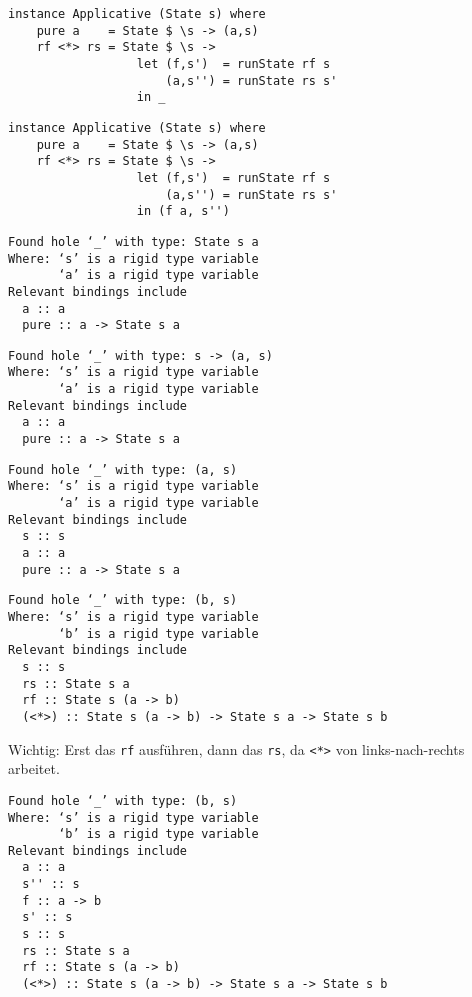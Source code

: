 \documentclass{beamer}
\begin{document}
\begin{frame}[fragile]
\begin{overprint}
\begin{verbatim}
\end{verbatim}
\begin{verbatim}
instance Applicative (State s) where
    pure a    = State $ \s -> (a,s)
    rf <*> rs = State $ \s ->
                  let (f,s')  = runState rf s
                      (a,s'') = runState rs s'
                  in _
\end{verbatim}
\begin{verbatim}
instance Applicative (State s) where
    pure a    = State $ \s -> (a,s)
    rf <*> rs = State $ \s ->
                  let (f,s')  = runState rf s
                      (a,s'') = runState rs s'
                  in (f a, s'')
\end{verbatim}
\end{overprint}
\bigskip
\scriptsize
\begin{overprint}
\begin{verbatim}
Found hole ‘_’ with type: State s a
Where: ‘s’ is a rigid type variable
       ‘a’ is a rigid type variable
Relevant bindings include
  a :: a
  pure :: a -> State s a
\end{verbatim}
\begin{verbatim}
Found hole ‘_’ with type: s -> (a, s)
Where: ‘s’ is a rigid type variable
       ‘a’ is a rigid type variable
Relevant bindings include
  a :: a
  pure :: a -> State s a
\end{verbatim}
\begin{verbatim}
Found hole ‘_’ with type: (a, s)
Where: ‘s’ is a rigid type variable
       ‘a’ is a rigid type variable
Relevant bindings include
  s :: s
  a :: a
  pure :: a -> State s a
\end{verbatim}
\begin{verbatim}
Found hole ‘_’ with type: (b, s)
Where: ‘s’ is a rigid type variable
       ‘b’ is a rigid type variable
Relevant bindings include
  s :: s
  rs :: State s a
  rf :: State s (a -> b)
  (<*>) :: State s (a -> b) -> State s a -> State s b
\end{verbatim}
\normalsize
Wichtig: Erst das \texttt{rf} ausführen, dann das \texttt{rs}, da \texttt{<*>} von links-nach-rechts arbeitet.
\scriptsize
\begin{verbatim}
Found hole ‘_’ with type: (b, s)
Where: ‘s’ is a rigid type variable
       ‘b’ is a rigid type variable
Relevant bindings include
  a :: a
  s'' :: s
  f :: a -> b
  s' :: s
  s :: s
  rs :: State s a
  rf :: State s (a -> b)
  (<*>) :: State s (a -> b) -> State s a -> State s b
\end{verbatim}
\end{overprint}
\end{frame}
\end{document}
